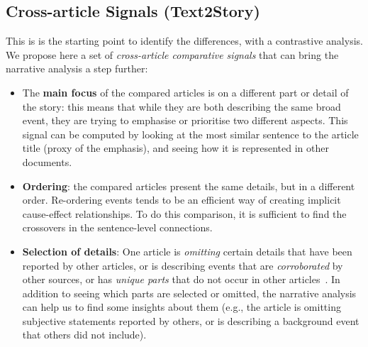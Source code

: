 \subsection{Cross-article Signals (Text2Story)}
This is is the starting point to identify the differences, with a contrastive analysis. We propose here a set of \emph{cross-article comparative signals} that can bring the narrative analysis a step further:
\begin{itemize}
    \item The \textbf{main focus} of the compared articles is on a different part or detail of the story: this means that while they are both describing the same broad event, they are trying to emphasise or prioritise two different aspects.
    This signal can be computed by looking at the most similar sentence to the article title (proxy of the emphasis), and seeing how it is represented in other documents.
    
    \item \textbf{Ordering}: the compared articles present the same details, but in a different order.
    Re-ordering events tends to be an efficient way of creating implicit cause-effect relationships. 
    To do this comparison, it is sufficient to find the crossovers in the sentence-level connections.

    \item \textbf{Selection of details}:
    One article is \emph{omitting} certain details that have been reported by other articles, or is describing events that are \emph{corroborated} by other sources, or has \emph{unique parts} that do not occur in other articles~\cite{bountouridis2018explaining}.
    In addition to seeing which parts are selected or omitted, the narrative analysis can help us to find some insights about them (e.g., the article is omitting subjective statements reported by others, or is describing a background event that others did not include).
    

\end{itemize}
